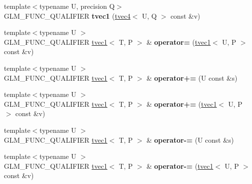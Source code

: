 \begin{DoxyCompactItemize}
\item 
{\footnotesize template$<$typename U, precision Q$>$ }\\G\+L\+M\+\_\+\+F\+U\+N\+C\+\_\+\+Q\+U\+A\+L\+I\+F\+I\+ER {\bfseries tvec1} (\hyperlink{structglm_1_1detail_1_1tvec4}{tvec4}$<$ U, Q $>$ const \&v)\hypertarget{structglm_1_1detail_1_1tvec1_afc81da6a984943c6e773834ab7fc75f0}{}\label{structglm_1_1detail_1_1tvec1_afc81da6a984943c6e773834ab7fc75f0}

\item 
{\footnotesize template$<$typename U $>$ }\\G\+L\+M\+\_\+\+F\+U\+N\+C\+\_\+\+Q\+U\+A\+L\+I\+F\+I\+ER \hyperlink{structglm_1_1detail_1_1tvec1}{tvec1}$<$ T, P $>$ \& {\bfseries operator=} (\hyperlink{structglm_1_1detail_1_1tvec1}{tvec1}$<$ U, P $>$ const \&v)\hypertarget{structglm_1_1detail_1_1tvec1_afdd165d59a6a8369e37b85676929e05d}{}\label{structglm_1_1detail_1_1tvec1_afdd165d59a6a8369e37b85676929e05d}

\item 
{\footnotesize template$<$typename U $>$ }\\G\+L\+M\+\_\+\+F\+U\+N\+C\+\_\+\+Q\+U\+A\+L\+I\+F\+I\+ER \hyperlink{structglm_1_1detail_1_1tvec1}{tvec1}$<$ T, P $>$ \& {\bfseries operator+=} (U const \&s)\hypertarget{structglm_1_1detail_1_1tvec1_ac367841556827c8b6a27e242490a7eef}{}\label{structglm_1_1detail_1_1tvec1_ac367841556827c8b6a27e242490a7eef}

\item 
{\footnotesize template$<$typename U $>$ }\\G\+L\+M\+\_\+\+F\+U\+N\+C\+\_\+\+Q\+U\+A\+L\+I\+F\+I\+ER \hyperlink{structglm_1_1detail_1_1tvec1}{tvec1}$<$ T, P $>$ \& {\bfseries operator+=} (\hyperlink{structglm_1_1detail_1_1tvec1}{tvec1}$<$ U, P $>$ const \&v)\hypertarget{structglm_1_1detail_1_1tvec1_a7513234bbb5711f30b59e0c94d8b0c46}{}\label{structglm_1_1detail_1_1tvec1_a7513234bbb5711f30b59e0c94d8b0c46}

\item 
{\footnotesize template$<$typename U $>$ }\\G\+L\+M\+\_\+\+F\+U\+N\+C\+\_\+\+Q\+U\+A\+L\+I\+F\+I\+ER \hyperlink{structglm_1_1detail_1_1tvec1}{tvec1}$<$ T, P $>$ \& {\bfseries operator-\/=} (U const \&s)\hypertarget{structglm_1_1detail_1_1tvec1_a67d5463cd82056cfaaedab976195e362}{}\label{structglm_1_1detail_1_1tvec1_a67d5463cd82056cfaaedab976195e362}

\item 
{\footnotesize template$<$typename U $>$ }\\G\+L\+M\+\_\+\+F\+U\+N\+C\+\_\+\+Q\+U\+A\+L\+I\+F\+I\+ER \hyperlink{structglm_1_1detail_1_1tvec1}{tvec1}$<$ T, P $>$ \& {\bfseries operator-\/=} (\hyperlink{structglm_1_1detail_1_1tvec1}{tvec1}$<$ U, P $>$ const \&v)\hypertarget{structglm_1_1detail_1_1tvec1_af596a5a7f5b2ea079cd85d576b62e326}{}\label{structglm_1_1detail_1_1tvec1_af596a5a7f5b2ea079cd85d576b62e326}


\end{DoxyCompactItemize}
